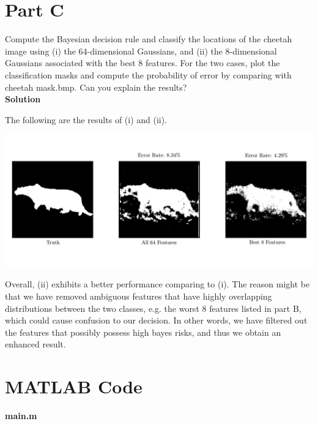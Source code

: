 \documentclass{article}
\begin{document}
\pagebreak

\section*{Part C}

Compute the Bayesian decision rule and classify the locations of the cheetah image using (i) the
64-dimensional Gaussians, and (ii) the 8-dimensional Gaussians associated with the best 8 features. For
the two cases, plot the classification masks and compute the probability of error by comparing with
cheetah mask.bmp. Can you explain the results?
\\

\textbf{\large Solution}

The following are the results of (i) and (ii).
\begin{center}
  \includegraphics[width=\textwidth]{result}
\end{center}

Overall, (ii) exhibits a better performance comparing to (i). 
The reason might be that we have removed ambiguous features that have highly overlapping distributions between the two classes, e.g. the worst 8 features listed in part B, which could cause confusion to our decision.
In other words, we have filtered out the features that possibly possess high bayes risks, and thus we obtain an enhanced result.

\pagebreak

\section*{MATLAB Code}

\textbf{\large main.m}
\end{document}
